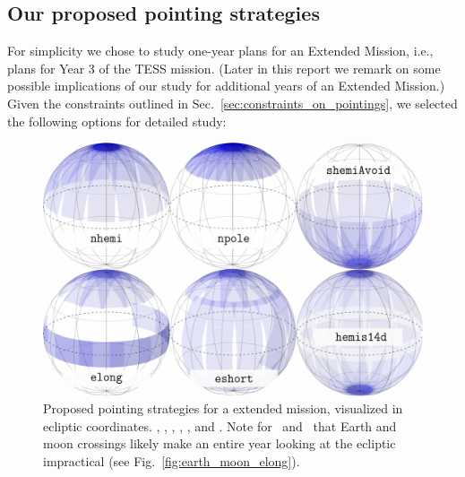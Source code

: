 \subsection{Our proposed pointing strategies}
\label{sec:proposed_pointings}

For simplicity we chose to study one-year plans for an Extended
Mission, i.e., plans for Year 3 of the TESS mission. (Later in this
report we remark on some possible implications of our study for
additional years of an Extended Mission.)  Given the constraints
outlined in Sec.~\ref{sec:constraints_on_pointings}, we selected the
following options for detailed study:

\begin{figure}[ht]
	\includegraphics{figures/proposed_pointings_texttt.pdf}
	\caption{Proposed pointing strategies for a \tess extended mission, visualized in ecliptic coordinates. \nhemi, \npole, \shemiAvoid, \elong, \eshort, and \hemis. Note for \elong\ and \eshort\ that Earth and moon crossings likely make an entire year looking at the ecliptic impractical (see Fig.~\protect\ref{fig:earth_moon_elong}).}
	\label{fig:proposed_pointings}
\end{figure}

